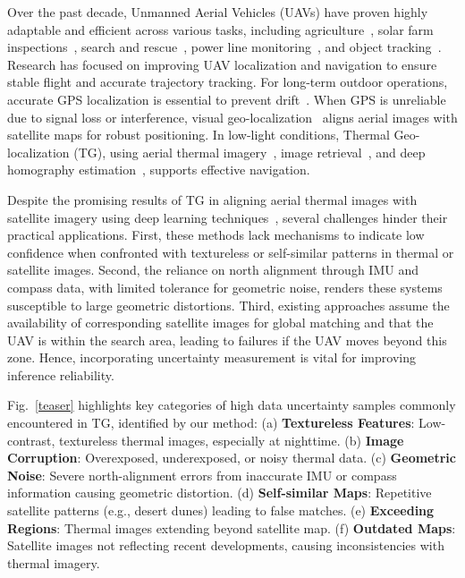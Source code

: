 Over the past decade, Unmanned Aerial Vehicles (UAVs) have proven highly adaptable and efficient across various tasks, including agriculture~\cite{info10110349}, solar farm inspections~\cite{drones6110347}, search and rescue~\cite{atif2021uav}, power line monitoring~\cite{rao2022quadformer, powerline}, and object tracking~\cite{saviolo2023unifying}. Research has focused on improving UAV localization and navigation to ensure stable flight and accurate trajectory tracking. For long-term outdoor operations, accurate GPS localization is essential to prevent drift~\cite{review_avl}. When GPS is unreliable due to signal loss or interference, visual geo-localization~\cite{foundloc, vgscience, directalign3, imgregistration} aligns aerial images with satellite maps for robust positioning. In low-light conditions, Thermal Geo-localization (TG), using aerial thermal imagery~\cite{lee2024caltech}, image retrieval~\cite{stl}, and deep homography estimation~\cite{STHN}, supports effective navigation.

Despite the promising results of TG in aligning aerial thermal images with satellite imagery using deep learning techniques~\cite{lecun2015deep}, several challenges hinder their practical applications. First, these methods lack mechanisms to indicate low confidence when confronted with textureless or self-similar patterns in thermal or satellite images. Second, the reliance on north alignment through IMU and compass data, with limited tolerance for geometric noise, renders these systems susceptible to large geometric distortions. Third, existing approaches assume the availability of corresponding satellite images for global matching and that the UAV is within the search area, leading to failures if the UAV moves beyond this zone. Hence, incorporating uncertainty measurement is vital for improving inference reliability. 

Fig.~\ref{teaser} highlights key categories of high data uncertainty samples commonly encountered in TG, identified by our method: (a) \textbf{Textureless Features}: Low-contrast, textureless thermal images, especially at nighttime. (b) \textbf{Image Corruption}: Overexposed, underexposed, or noisy thermal data. (c) \textbf{Geometric Noise}: Severe north-alignment errors from inaccurate IMU or compass information causing geometric distortion. (d) \textbf{Self-similar Maps}: Repetitive satellite patterns (e.g., desert dunes) leading to false matches. (e) \textbf{Exceeding Regions}: Thermal images extending beyond satellite map. (f) \textbf{Outdated Maps}: Satellite images not reflecting recent developments, causing inconsistencies with thermal imagery.


